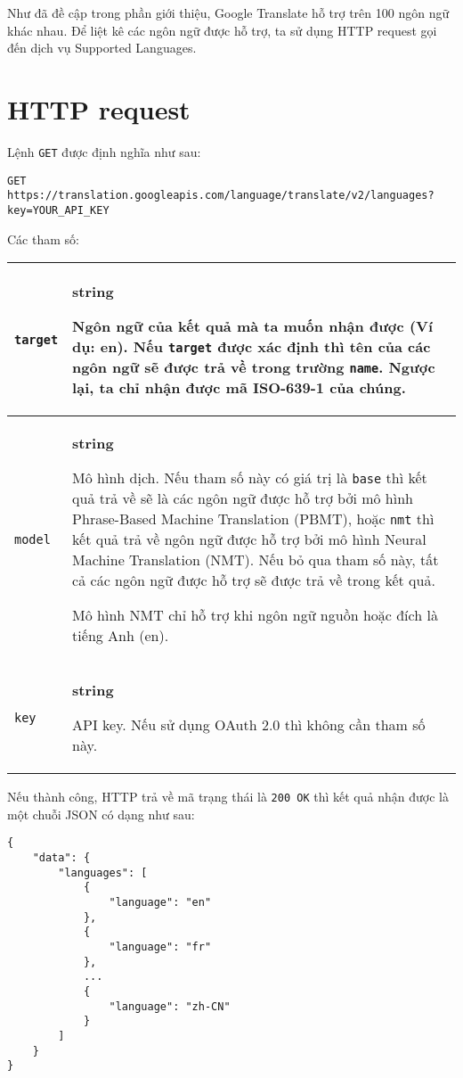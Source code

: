 \documentclass[../thesis.tex]{subfiles}
\begin{document}
Như đã đề cập trong phần giới thiệu, Google Translate hỗ trợ trên 100 ngôn ngữ khác nhau. Để liệt kê các ngôn ngữ được hỗ trợ, ta sử dụng HTTP request gọi đến dịch vụ Supported Languages.

\section{HTTP request}

Lệnh \lstinline{GET} được định nghĩa như sau:

\begin{lstlisting}[style=link]
GET https://translation.googleapis.com/language/translate/v2/languages?key=YOUR_API_KEY
\end{lstlisting}

Các tham số:

\begin{center}
\begin{tabularx}{\textwidth}{|p{}|X|}
\hline
\lstinline{target} & \textbf{string}

Ngôn ngữ của kết quả mà ta muốn nhận được (Ví dụ: en). Nếu \lstinline{target} được xác định thì tên của các ngôn ngữ sẽ được trả về trong trường \lstinline{name}. Ngược lại, ta chỉ nhận được mã ISO-639-1 của chúng.\\
\hline
\lstinline{model} & \textbf{string}

Mô hình dịch. Nếu tham số này có giá trị là \lstinline{base} thì kết quả trả về sẽ là các ngôn ngữ được hỗ trợ bởi mô hình Phrase-Based Machine Translation (PBMT), hoặc \lstinline{nmt} thì kết quả trả về ngôn ngữ được hỗ trợ bởi mô hình Neural Machine Translation (NMT). Nếu bỏ qua tham số này, tất cả các ngôn ngữ được hỗ trợ sẽ được trả về trong kết quả.

Mô hình NMT chỉ hỗ trợ khi ngôn ngữ nguồn hoặc đích là tiếng Anh (en).\\
\hline
\lstinline{key} & \textbf{string}

API key. Nếu sử dụng OAuth 2.0 thì không cần tham số này.\\
\hline
\end{tabularx}
\end{center}

Nếu thành công, HTTP trả về mã trạng thái là \lstinline{200 OK} thì kết quả nhận được là một chuỗi JSON có dạng như sau:

\begin{lstlisting}[style=link]
{
	"data": {
		"languages": [
			{
				"language": "en"
			},
			{
				"language": "fr"
			},
			...
			{
				"language": "zh-CN"
			}
		]
	}
}
\end{lstlisting}
\end{document}
